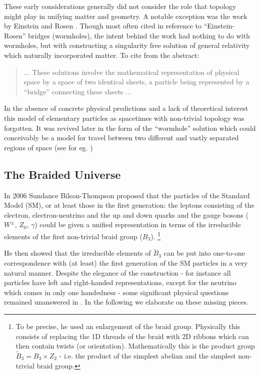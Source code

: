 \documentclass[11pt,english,rmp]{revtex4}
\begin{document}
These early considerations generally did not consider the role that
topology might play in unifying matter and geometry. A notable exception
was the work by Einstein and Rosen \cite{Einstein1935Particle}. Though
most often cited in reference to ``Einstein-Rosen'' bridges (wormholes),
the intent behind the work had nothing to do with wormholes, but with
constructing a singularity free solution of general relativity which
naturally incorporated matter. To cite from the abstract:
\begin{quote}
... These solutions involve the mathematical representation of physical
space by a space of two identical sheets, a particle being represented
by a {}``bridge'' connecting these sheets ... 
\end{quote}
In the absence of concrete physical predictions and a lack of theoretical
interest this model of elementary particles as spacetimes with non-trivial
topology was forgotten. It was revived later in the form of the {}``wormhole''
solution which could conceivably be a model for travel between two
different and vastly separated regions of space (see for eg. \cite{Visser1996Lorentzian})

\subsection{The Braided Universe}

In 2006 Sundance Bilson-Thompson proposed that the particles of the
Standard Model (SM), or at least those in the first generation: the
leptons consisting of the electron, electron-neutrino and the up and
down quarks and the gauge bosons ($W^{\pm}$, $Z_{0}$, $\gamma$)
could be given a unified representation in terms of the irreducible
elements of the first non-trivial braid group ($B_{3}$).%
\footnote{To be precise, he used an enlargement of the braid group. Physically
this consists of replacing the 1D threads of the braid with 2D ribbons
which can then contain twists (or orientation). Mathematically this
is the product group $\tilde{B}_{3}=B_{3}\times Z_{2}$ - i.e. the
product of the simplest abelian and the simplest non-trivial braid
group.%
}

He then showed that the irreducible elements of $\tilde{B}_{3}$ can
be put into one-to-one correspondence with (at least) the first generation
of the SM particles in a very natural manner. Despite the elegance
of the construction - for instance all particles have left and right-handed
representations, except for the neutrino which comes in only one handedness
- some significant physical questions remained unanswered in \cite{BilsonThompson2006Quantum}.
In the following we elaborate on these missing pieces.
\end{document}
